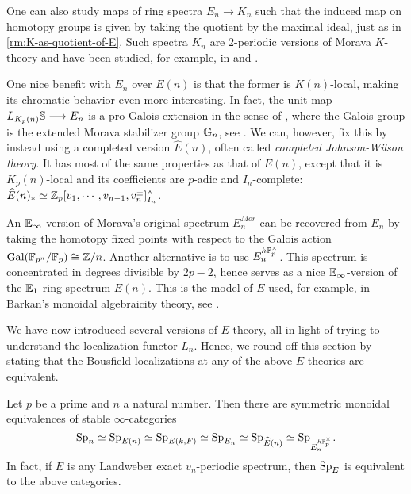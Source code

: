 \begin{remark}
    One can also study maps of ring spectra $E_n \longrightarrow K_n$ such that the induced map on homotopy groups is given by taking the quotient by the maximal ideal, just as in \cref{rm:K-as-quotient-of-E}. Such spectra $K_n$ are $2$-periodic versions of Morava $K$-theory and have been studied, for example, in \cite{hopkins-lurie_17} and \cite{barthel-pstragowski_2021}. 
\end{remark}

\begin{remark}
    One nice benefit with $E_n$ over $E(n)$ is that the former is $K(n)$-local, making its chromatic behavior even more interesting. In fact, the unit map $L_{K_p(n)}\S \longrightarrow E_n$ is a pro-Galois extension in the sense of \cite{rognes_08}, where the Galois group is the extended Morava stabilizer group $\G_n$, see \cite{devinatz-hopkins_2004}. We can, however, fix this by instead using a completed version $\widehat{E}(n)$, often called \emph{completed Johnson-Wilson theory}. It has most of the same properties as that of $E(n)$, except that it is $K_p(n)$-local and its coefficients are $p$-adic and $I_n$-complete: $\widehat{E}(n)_* \simeq \Z_p[v_1, \cdots, v_{n-1}, v_n^{\pm}]^\wedge_{I_n}$. 
\end{remark}

\begin{remark}
    An $\E_\infty$-version of Morava's original spectrum $E_n^{Mor}$ can be recovered from $E_n$ by taking the homotopy fixed points with respect to the Galois action $\mathrm{Gal}(\F_{p^n}/\F_p)\cong \Z/n$. Another alternative is to use $E_n^{h\F_p^\times}$. This spectrum is concentrated in degrees divisible by $2p-2$, hence serves as a nice $\E_\infty$-version of the $\E_1$-ring spectrum $E(n)$. This is the model of $E$ used, for example, in Barkan's monoidal algebraicity theory, see \cite{barkan_2023}. 
\end{remark}

We have now introduced several versions of $E$-theory, all in light of trying to understand the localization functor $L_n$. Hence, we round off this section by stating that the Bousfield localizations at any of the above $E$-theories are equivalent. 

\begin{proposition}
    \label{prop:all-E-local-cats-are-equivalent}
    Let $p$ be a prime and $n$ a natural number. Then there are symmetric monoidal equivalences of stable $\infty$-categories 
    $$\sp_n \simeq \sp_{E(n)} \simeq \sp_{E(k,F)}\simeq \sp_{E_n} \simeq \sp_{\widehat{E}(n)}\simeq \sp_{E_n^{h\F_p^\times}}.$$
    In fact, if $E$ is any Landweber exact $v_n$-periodic spectrum, then $\sp_E$ is equivalent to the above categories. 
\end{proposition}

